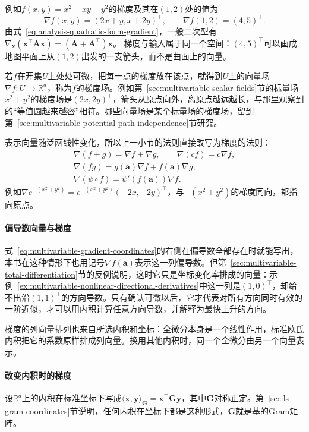 例如$f(x,y)=x^2+xy+y^2$的梯度及其在$(1,2)$处的值为
\[
 \nabla f(x,y)=(2x+y,x+2y)^\top,\qquad\nabla f(1,2)=(4,5)^\top.
\]
由式~\eqref{eq:analysis-quadratic-form-gradient}，一般二次型有$\nabla_{\bm x}(\bm x^\top\bm A\bm x)=(\bm A+\bm A^\top)\bm x$。
梯度与输入属于同一个空间：$(4,5)^\top$可以画成地图平面上从$(1,2)$出发的一支箭头，而不是曲面上的向量。

若$f$在开集$U$上处处可微，把每一点的梯度放在该点，就得到$U$上的向量场$\nabla f:U\to\mathbb R^d$，称为$f$的梯度场。例如第~\ref{sec:multivariable-scalar-fields}节的标量场$x^2+y^2$的梯度场是$(2x,2y)^\top$，箭头从原点向外，离原点越远越长，与那里观察到的“等值圆越来越密”相符。哪些向量场是某个标量场的梯度场，留到第~\ref{sec:multivariable-potential-path-independence}节研究。

表示向量随泛函线性变化，所以上一小节的法则直接改写为梯度的法则：
\[
 \begin{gathered}
 \nabla(f\pm g)=\nabla f\pm\nabla g,\qquad\nabla(cf)=c\nabla f,\\
 \nabla(fg)=g(\bm a)\nabla f+f(\bm a)\nabla g,\\
 \nabla(\psi\circ f)=\psi'(f(\bm a))\nabla f.
 \end{gathered}
\]
例如$\nabla e^{-(x^2+y^2)}=e^{-(x^2+y^2)}(-2x,-2y)^\top$，与$-(x^2+y^2)$的梯度同向，都指向原点。

\paragraph{偏导数向量与梯度}
式~\eqref{eq:multivariable-gradient-coordinates}的右侧在偏导数全部存在时就能写出，本书在这种情形下也用记号$\nabla f(\bm a)$表示这一列偏导数。但第~\ref{sec:multivariable-total-differentiation}节的反例说明，这时它只是坐标变化率排成的向量：示例~\ref{ex:multivariable-nonlinear-directional-derivatives}中这一列是$(1,0)^\top$，却给不出沿$(1,1)^\top$的方向导数。只有确认可微以后，它才代表对所有方向同时有效的一阶近似，才可以用内积计算任意方向导数，并解释为最快上升的方向。

梯度的列向量排列也来自所选内积和坐标：全微分本身是一个线性作用，标准欧氏内积把它的系数原样排成列向量。换用其他内积时，同一个全微分由另一个向量表示。

\paragraph{改变内积时的梯度}
设$\mathbb R^d$上的内积在标准坐标下写成$\langle\bm x,\bm y\rangle_{\bm G}=\bm x^\top\bm G\bm y$，其中$\bm G$对称正定。第~\ref{sec:ls-gram-coordinates}节说明，任何内积在坐标下都是这种形式，$\bm G$就是基的Gram矩阵。

